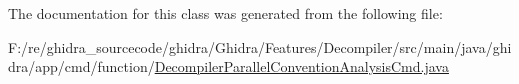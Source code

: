The documentation for this class was generated from the following file\+:\begin{DoxyCompactItemize}
\item 
F\+:/re/ghidra\+\_\+sourcecode/ghidra/\+Ghidra/\+Features/\+Decompiler/src/main/java/ghidra/app/cmd/function/\mbox{\hyperlink{_decompiler_parallel_convention_analysis_cmd_8java}{Decompiler\+Parallel\+Convention\+Analysis\+Cmd.\+java}}\end{DoxyCompactItemize}
